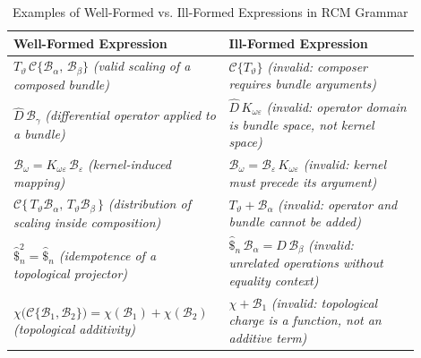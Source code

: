 \begin{table}[H]
  \centering
  \caption{Examples of Well-Formed vs. Ill-Formed Expressions in RCM Grammar}
  \label{tab:rcm-grammar-validity}
  \renewcommand{\arraystretch}{1.5}
  \begin{tabular}{@{}>{\raggedright\arraybackslash}p{0.45\linewidth} >{\raggedright\arraybackslash}p{0.45\linewidth}@{}}
    \toprule
    \textbf{Well-Formed Expression} & \textbf{Ill-Formed Expression} \\
    \midrule
    \( T_{\vartheta}\,\mathcal{C}\{\mathcal{B}_\alpha,\,\mathcal{B}_\beta\} \)  
    \newline \textit{(valid scaling of a composed bundle)} 
    &
    \( \mathcal{C}\{T_{\vartheta}\} \)  
    \newline \textit{(invalid: composer requires bundle arguments)} 
    \\

    \( \hat{D}\,\mathcal{B}_\gamma \)  
    \newline \textit{(differential operator applied to a bundle)} 
    &
    \( \hat{D}\,K_{\omega\varepsilon} \)  
    \newline \textit{(invalid: operator domain is bundle space, not kernel space)} 
    \\

    \( \mathcal{B}_\omega = K_{\omega\varepsilon}\,\mathcal{B}_\varepsilon \)  
    \newline \textit{(kernel-induced mapping)} 
    &
    \( \mathcal{B}_\omega = \mathcal{B}_\varepsilon\,K_{\omega\varepsilon} \)  
    \newline \textit{(invalid: kernel must precede its argument)} 
    \\

    \( \mathcal{C}\{\,T_{\vartheta}\mathcal{B}_\alpha,\,T_{\vartheta}\mathcal{B}_\beta\,\} \)  
    \newline \textit{(distribution of scaling inside composition)} 
    &
    \( T_{\vartheta} + \mathcal{B}_\alpha \)  
    \newline \textit{(invalid: operator and bundle cannot be added)} 
    \\

    \( \hat{\$}_n^2 = \hat{\$}_n \)  
    \newline \textit{(idempotence of a topological projector)} 
    &
    \( \hat{\$}_n\,\mathcal{B}_\alpha = \hat{D}\,\mathcal{B}_\beta \)  
    \newline \textit{(invalid: unrelated operations without equality context)} 
    \\

    \( \chi\bigl(\mathcal{C}\{\mathcal{B}_1, \mathcal{B}_2\}\bigr) = \chi(\mathcal{B}_1) + \chi(\mathcal{B}_2) \)  
    \newline \textit{(topological additivity)} 
    &
    \( \chi + \mathcal{B}_1 \)  
    \newline \textit{(invalid: topological charge is a function, not an additive term)} 
    \\
    \bottomrule
  \end{tabular}
\end{table}


